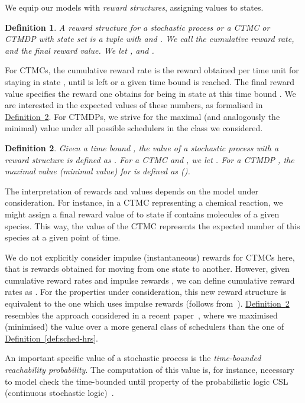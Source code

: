 \documentclass[10pt,twocolumn]{article}
\newtheorem{definition}{Definition}
\newcommand{\refdef}[1]{\texorpdfstring{\hyperref[def:#1]{Definition~\ref*{def:#1}}}{Definition \ref*{def:#1}}}
\begin{document}
We equip our models with \emph{reward structures}, assigning values to states.
\begin{definition}
\label{def:reward-structure}
  A \emph{reward structure} for a stochastic process  or a CTMC or CTMDP with state set  is a tuple  with  and .
  We call  the \emph{cumulative reward rate}, and  the \emph{final reward value}.
  We let , and .
\end{definition}

For CTMCs, the cumulative reward rate  is the reward obtained per time unit for staying in state , until  is left or a given time bound  is reached.
The final reward value  specifies the reward one obtains for being in state  at this time bound .
We are interested in the expected values of these numbers, as formalised in \refdef{value}.
For CTMDPs, we strive for the maximal (and analogously the minimal) value under all possible schedulers in the class we considered.
\begin{definition}
  \label{def:value}
Given a time bound , the \emph{value} of a stochastic process  with a reward structure  is defined as .
  For a CTMC  and , we let .
  For a CTMDP , the \emph{maximal value} (\emph{minimal value}) for  is defined as  ().
\end{definition}
The interpretation of rewards and values depends on the model under consideration.
For instance, in a CTMC representing a chemical reaction, we might assign a final reward value of  to state  if  contains  molecules of a given species.
This way, the value of the CTMC represents the expected number of this species at a given point of time.

We do not explicitly consider impulse (instantaneous) rewards  for CTMCs here, that is rewards obtained for moving from one state to another.
However, given cumulative reward rates  and impulse rewards , we can define cumulative reward rates  as .
For the properties under consideration, this new reward structure is equivalent to the one which uses impulse rewards (follows from~\cite[(6)]{KwiatkowskaNP06}).
\refdef{value} resembles the approach considered in a recent paper~\cite{BuchholzHHZ11}, where we maximised (minimised) the value over a more general class of schedulers than the one of \refdef{sched-hrs}.

An important specific value of a stochastic process is
the \emph{time-bounded reachability probability}. The computation
of this value is, for instance, necessary to model check the
time-bounded until property of the probabilistic logic CSL
(continuous stochastic logic)~\cite{BaierHHK03}.
\end{document}

